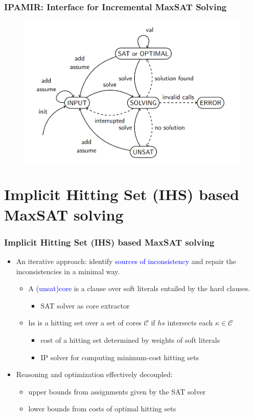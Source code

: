 \documentclass[aspectratio=169 %
,serif,mathserif]{beamer}
\begin{document}
\begin{frame}
	\frametitle{IPAMIR: Interface for Incremental MaxSAT Solving}
	\begin{figure}[htbp]
		\includegraphics[width=0.6\linewidth]{5.png}
	\end{figure}
\end{frame}

\section{Implicit Hitting Set (IHS) based MaxSAT solving}
\begin{frame}
	\frametitle{Implicit Hitting Set (IHS) based MaxSAT solving}
	\begin{itemize}
		\item An iterative approach: identify \textcolor{blue}{sources of inconsistency} and repair the inconsistencies in a minimal way.
		\begin{itemize}
			\item A \textcolor{blue}{(unsat)core} is a clause over soft literals entailed by the hard clauses.
			\begin{itemize}
				\item SAT solver as core extractor
			\end{itemize} \pause
			\item hs is a hitting set over a set of cores $\mathcal{C}$ if $hs$ intersects each $\kappa \in \mathcal{C}$
			\begin{itemize}
				\item cost of a hitting set determined by weights of soft literals
				\item IP solver for computing minimum-cost hitting sets
			\end{itemize} 
		\end{itemize} \pause
		\item Reasoning and optimization effectively decoupled:
		\begin{itemize}		
			\item upper bounds from assignments given by the SAT solver
			\item lower bounds from costs of optimal hitting sets
		\end{itemize}
	\end{itemize}
\end{frame}
\end{document}
